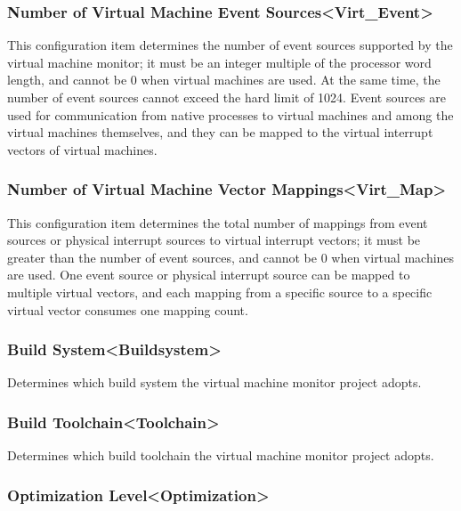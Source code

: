 \subsubsection{Number of Virtual Machine Event Sources<Virt\_Event>{}}\label{subsubsec:5-3-13-9}

This configuration item determines the number of event sources supported by the virtual machine monitor; it must be an integer multiple of the processor word length, and cannot be 0 when virtual machines are used. At the same time, the number of event sources cannot exceed the hard limit of 1024. Event sources are used for communication from native processes to virtual machines and among the virtual machines themselves, and they can be mapped to the virtual interrupt vectors of virtual machines.

\subsubsection{Number of Virtual Machine Vector Mappings<Virt\_Map>{}}\label{subsubsec:5-3-13-10}

This configuration item determines the total number of mappings from event sources or physical interrupt sources to virtual interrupt vectors; it must be greater than the number of event sources, and cannot be 0 when virtual machines are used. One event source or physical interrupt source can be mapped to multiple virtual vectors, and each mapping from a specific source to a specific virtual vector consumes one mapping count.

\subsubsection{Build System<Buildsystem>{}}\label{subsubsec:5-3-13-11}

Determines which build system the virtual machine monitor project adopts.

\subsubsection{Build Toolchain<Toolchain>{}}\label{subsubsec:5-3-13-12}

Determines which build toolchain the virtual machine monitor project adopts.

\subsubsection{Optimization Level<Optimization>{}}\label{subsubsec:5-3-13-13}


